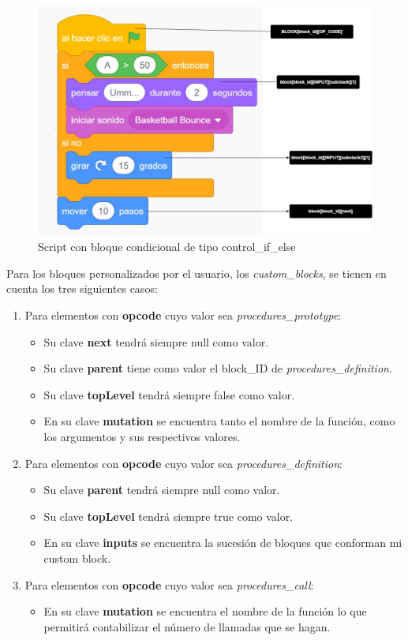 \documentclass[a4paper, 12pt]{book}
\begin{document}
\begin{figure}
  \centering
  \includegraphics[width=13cm, keepaspectratio]{img/scratch_special.jpg}
  \caption{Script con bloque condicional de tipo control\_if\_else}
  \label{fig:scratch_special}
\end{figure}

\newpage 
Para los bloques personalizados por el usuario, los \textit{custom\_blocks}, se tienen en cuenta los tres siguientes casos:

\begin{enumerate}
\item Para elementos con \textbf{opcode} cuyo valor sea \textit{procedures\_prototype}:
\begin{itemize}
\item Su clave \textbf{next} tendrá siempre null como valor.
\item Su clave \textbf{parent} tiene como valor el block\_ID de \textit{procedures\_definition}.
\item Su clave \textbf{topLevel} tendrá siempre false como valor.
\item En su clave \textbf{mutation} se encuentra tanto el nombre de la función, como los argumentos y sus respectivos valores.
\end{itemize}

\item Para elementos con \textbf{opcode} cuyo valor sea \textit{procedures\_definition}:
\begin{itemize}
\item Su clave \textbf{parent} tendrá siempre null como valor.
\item Su clave \textbf{topLevel} tendrá siempre true como valor.
\item En su clave \textbf{inputs} se encuentra la sucesión de bloques que conforman mi custom block.
\end{itemize}

\item Para elementos con \textbf{opcode} cuyo valor sea \textit{procedures\_call}:
\begin{itemize}
\item En su clave \textbf{mutation} se encuentra el nombre de la función lo que permitirá contabilizar el número de llamadas que se hagan.
\end{itemize}
\end{enumerate}
\end{document}

